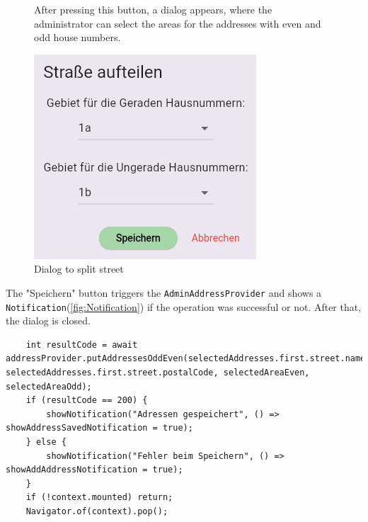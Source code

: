 \begin{figure}[H] 
    \begin{minipage}{0.6\textwidth}
        After pressing this button, a dialog appears, where the administrator can select the areas for the addresses with even and odd house numbers.
    \end{minipage}
    \hfill
    \begin{minipage}{0.35\textwidth}
        \centering
        \includegraphics[width=\linewidth]{images/AdminPanel/splitStreetDialog.png}
        \caption{Dialog to split street}
    \end{minipage}
\end{figure}


The "Speichern" button triggers the \texttt{AdminAddressProvider} and shows a \texttt{Notification}(\ref{fig:Notification}) if the operation was successful or not. After that, the dialog is closed.

\lstset{style=mycsharp, caption=onPressed save button in splitStreetDialog}
\begin{lstlisting}
    int resultCode = await addressProvider.putAddressesOddEven(selectedAddresses.first.street.name, selectedAddresses.first.street.postalCode, selectedAreaEven, selectedAreaOdd);
    if (resultCode == 200) {
        showNotification("Adressen gespeichert", () => showAddressSavedNotification = true);
    } else {
        showNotification("Fehler beim Speichern", () => showAddAddressNotification = true);
    }
    if (!context.mounted) return;
    Navigator.of(context).pop();
\end{lstlisting}



